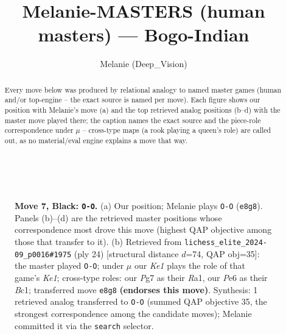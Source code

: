 \documentclass[11pt]{article}
\title{Melanie-MASTERS (human masters) — Bogo-Indian}
\author{Melanie (Deep\_Vision)}
\date{}
\begin{document}
\maketitle

\begin{abstract}Every move below was produced by relational analogy to named master games (human and/or top-engine -- the exact source is named per move). Each figure shows our position with Melanie's move (a) and the top retrieved analog positions (b--d) with the master move played there; the caption names the exact source and the piece-role correspondence under $\mu$ -- cross-type maps (a rook playing a queen's role) are called out, as no material/eval engine explains a move that way.\end{abstract}

\begin{figure}[p]\centering
\begin{subfigure}{0.46\textwidth}\centering
\resizebox{\linewidth}{!}{%
\newchessgame
\chessboard[
  setfen={r1b1k2r/ppppqppp/2n1pn2/8/2PP4/2B2NP1/PP2PP1P/R2QKB1R b KQkq - 0 7},
  showmover=false,
  pgfstyle=straightmove, color=movearrow, markmove={e8-g8}
]}
\caption{}
\end{subfigure}\hfill
\begin{subfigure}{0.46\textwidth}\centering
\resizebox{\linewidth}{!}{%
\newchessgame
\chessboard[
  setfen={1r1qkb1r/4ppp1/p4n1p/3p1b2/Pn1P4/2N2NP1/1P2PPBP/R1BQK2R w KQk - 5 13},
  showmover=false,
  pgfstyle=straightmove, color=movearrow, markmove={e1-g1}
]}
\caption{}
\end{subfigure}
\\[4pt]

\caption{\textbf{Move 7, Black: \texttt{O-O}.} (a) Our position; Melanie plays \texttt{O-O} (\texttt{e8g8}). Panels (b)--(d) are the retrieved master positions whose correspondence most drove this move (highest QAP objective among those that transfer to it). (b) Retrieved from \texttt{lichess\_elite\_2024-09\_p0016\#1975} (ply 24) [structural distance $d$=74, QAP obj=35]: the master played \texttt{O-O}; under $\mu$ our \emph{Ke1} plays the role of that game's \emph{Ke1}; cross-type roles: our \emph{P}g7 as their \emph{R}a1, our \emph{P}e6 as their \emph{B}c1; transferred move \texttt{e8g8} \textbf{(endorses this move)}. Synthesis: 1 retrieved analog transferred to \texttt{O-O} (summed QAP objective 35, the strongest correspondence among the candidate moves); Melanie committed it via the \texttt{search} selector.}
\label{fig:thought-m13}
\end{figure}
\end{document}
